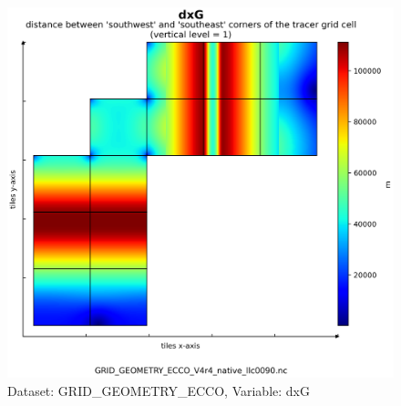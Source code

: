 \begin{figure}[H]
\centering
\includegraphics[scale=0.55]{../images/plots/v4r4/native_plots_coords/Geometry_Parameters_for_the_Lat-Lon-Cap_90_(llc90)_Native_Model_Grid_(Version_4_Release_4)/dxG.png}
\caption{Dataset: GRID\_GEOMETRY\_ECCO, Variable: dxG}
\label{tab:table-GRID_GEOMETRY_ECCO_dxG-Plot}
\end{figure}
\newpage
\pagebreak

